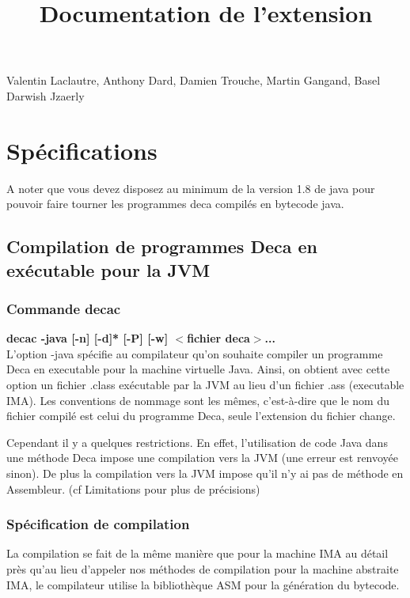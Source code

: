 \documentclass[12pt, a4paper, one side]{article}
\title{Documentation de l'extension}
\author{}
\date{}
\begin{document}
    \maketitle

    \begin{center}
        Valentin Laclautre, Anthony Dard, Damien Trouche, Martin Gangand, Basel Darwish Jzaerly
    \end{center}

    \tableofcontents

    \newpage

    \section{Spécifications}

    A noter que vous devez disposez au minimum de la version 1.8 de java pour
    pouvoir faire tourner les programmes deca compilés en bytecode java.

    \subsection{Compilation de programmes Deca en exécutable pour la JVM}
    \subsubsection{Commande decac}
    \textbf{decac -java [-n] [-d]* [-P] [-w] $<$fichier deca$>$...}
    \\

    L'option -java spécifie au compilateur qu'on souhaite compiler un programme Deca en executable pour la machine virtuelle Java.
    Ainsi, on obtient avec cette option un fichier .class exécutable par la JVM au lieu d'un fichier .ass (executable IMA). Les conventions de nommage sont les mêmes, c'est-à-dire que le nom du fichier compilé est celui du programme Deca, seule l'extension du fichier change.

    Cependant il y a quelques restrictions. En effet, l'utilisation de code Java dans une méthode Deca impose une compilation vers la JVM (une erreur est renvoyée sinon). De plus la compilation vers la JVM impose qu'il n'y ai pas de méthode en Assembleur. (cf Limitations pour plus de précisions)

    \subsubsection{Spécification de compilation}
    La compilation se fait de la même manière que pour la machine IMA au détail près qu'au lieu d'appeler nos méthodes de compilation pour la machine abstraite IMA, le compilateur utilise la bibliothèque ASM\cite{ASM} pour la génération du bytecode.
\end{document}

